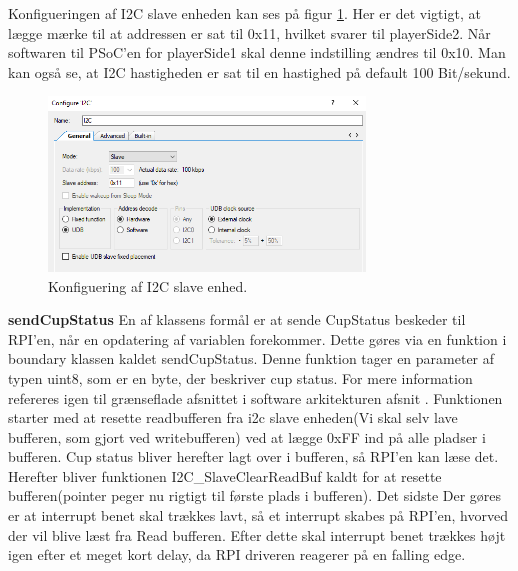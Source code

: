 \documentclass[Softwaredesign/Softwaredesign_main.tex]{subfiles}
\begin{document}
Konfigueringen af I2C slave enheden kan ses på figur \ref{fig:i2c_settings}. Her er det vigtigt, at lægge mærke til at addressen er sat til 0x11, hvilket svarer til playerSide2. Når softwaren til PSoC'en for playerSide1 skal denne indstilling ændres til 0x10. Man kan også se, at I2C hastigheden er sat til en hastighed på default 100 Bit/sekund. 
\begin{figure}[H]
    \centering
    \includegraphics[width=0.75\textwidth]{Softwaredesign/RPI_IF/graphics/i2c_settings.PNG}
    \caption{Konfiguering af I2C slave enhed.}
    \label{fig:i2c_settings}
\end{figure}

\textbf{sendCupStatus}
En af klassens formål er at sende CupStatus beskeder til RPI'en, når en opdatering af variablen forekommer. Dette gøres  via en funktion i boundary klassen kaldet sendCupStatus. Denne funktion tager en parameter af typen uint8, som er en byte, der beskriver cup status. For mere information refereres igen til grænseflade afsnittet i software arkitekturen afsnit . Funktionen starter med at resette readbufferen fra i2c slave enheden(Vi skal selv lave bufferen, som gjort ved writebufferen) ved at lægge 0xFF ind på alle pladser i bufferen. Cup status bliver herefter lagt over i bufferen, så RPI'en kan læse det. Herefter bliver funktionen I2C\_SlaveClearReadBuf kaldt for at resette bufferen(pointer peger nu rigtigt til første plads i bufferen). Det sidste Der gøres er at interrupt benet skal trækkes lavt, så et interrupt skabes på RPI'en, hvorved der vil blive læst fra Read bufferen.  Efter dette skal interrupt benet trækkes højt igen efter et meget kort delay, da RPI driveren reagerer på en falling edge.
\end{document}
